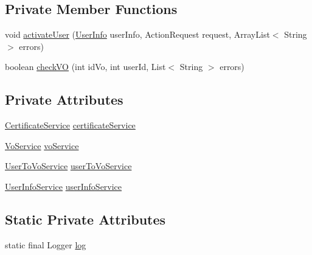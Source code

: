 \subsection*{Private Member Functions}
\begin{DoxyCompactItemize}
\item 
void \hyperlink{classportal_1_1registration_1_1controller_1_1AddUserToVOController_abd142c68f2e74216087976e202ab1eae}{activateUser} (\hyperlink{classportal_1_1registration_1_1domain_1_1UserInfo}{UserInfo} userInfo, ActionRequest request, ArrayList$<$ String $>$ errors)
\item 
boolean \hyperlink{classportal_1_1registration_1_1controller_1_1AddUserToVOController_a31c8971c1e53637d1d8b26e660f77397}{checkVO} (int idVo, int userId, List$<$ String $>$ errors)
\end{DoxyCompactItemize}
\subsection*{Private Attributes}
\begin{DoxyCompactItemize}
\item 
\hyperlink{interfaceportal_1_1registration_1_1services_1_1CertificateService}{CertificateService} \hyperlink{classportal_1_1registration_1_1controller_1_1AddUserToVOController_a2361af71b8bfdc3c7e61edbfda6bf0fa}{certificateService}
\item 
\hyperlink{interfaceportal_1_1registration_1_1services_1_1VoService}{VoService} \hyperlink{classportal_1_1registration_1_1controller_1_1AddUserToVOController_a066b9dc1ebc1bed7b1a339b08a2f1b63}{voService}
\item 
\hyperlink{interfaceportal_1_1registration_1_1services_1_1UserToVoService}{UserToVoService} \hyperlink{classportal_1_1registration_1_1controller_1_1AddUserToVOController_ae77dbacf0a44558167aacd12ad393c4a}{userToVoService}
\item 
\hyperlink{interfaceportal_1_1registration_1_1services_1_1UserInfoService}{UserInfoService} \hyperlink{classportal_1_1registration_1_1controller_1_1AddUserToVOController_a49a22ec138007745c8173f2f3da096a0}{userInfoService}
\end{DoxyCompactItemize}
\subsection*{Static Private Attributes}
\begin{DoxyCompactItemize}
\item 
static final Logger \hyperlink{classportal_1_1registration_1_1controller_1_1AddUserToVOController_a133f4ebcf54552effe4fbca418cb7e18}{log}
\end{DoxyCompactItemize}


